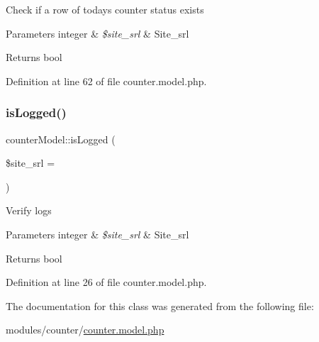 Check if a row of today\textquotesingle{}s counter status exists


\begin{DoxyParams}[1]{Parameters}
integer & {\em \$site\+\_\+srl} & Site\+\_\+srl \\
\hline
\end{DoxyParams}
\begin{DoxyReturn}{Returns}
bool 
\end{DoxyReturn}


Definition at line 62 of file counter.\+model.\+php.

\mbox{\label{classcounterModel_a8d9351da08e33d6f47f8645d87ec9380}} 
\subsubsection{\texorpdfstring{is\+Logged()}{isLogged()}}
{\footnotesize\ttfamily counter\+Model\+::is\+Logged (\begin{DoxyParamCaption}\item[{}]{\$site\+\_\+srl = {} }\end{DoxyParamCaption})}

Verify logs


\begin{DoxyParams}[1]{Parameters}
integer & {\em \$site\+\_\+srl} & Site\+\_\+srl \\
\hline
\end{DoxyParams}
\begin{DoxyReturn}{Returns}
bool 
\end{DoxyReturn}


Definition at line 26 of file counter.\+model.\+php.



The documentation for this class was generated from the following file\+:\begin{DoxyCompactItemize}
\item 
modules/counter/\hyperlink{counter_8model_8php}{counter.\+model.\+php}\end{DoxyCompactItemize}
